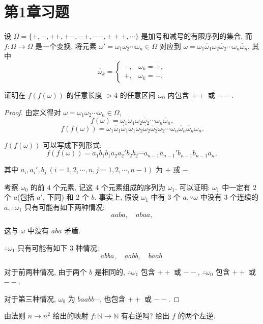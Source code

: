 \documentclass{ctexart}
\begin{document}
\section{第1章习题}
\setcounter{exsection}{5}
\begin{exercise}%
    设 $\Omega=\{+,-,++,+-,-+,--,+++,\cdots\}$ 是加号和减号的有限序列的集合, 而 $f:\Omega\to\Omega$ 是一个变换, 将元素 $\omega'=\omega_1\omega_2\cdots\omega_n\in\Omega$ 对应到 $\omega=\omega_1\dot{\omega_1}\omega_2\dot{\omega_2}\cdots\omega_n\dot{\omega_n}$, 其中
    \[\dot{\omega_k}=\begin{cases}
        -, & \omega_k=+, \\
        +, & \omega_k=-.
    \end{cases}\]
    
    证明在 $f(f(\omega))$ 的任意长度 $>4$ 的任意区间 $\omega_0$ 内包含 $++$ 或 $--$.    
\end{exercise}
\begin{proof}
    由定义得对 $\omega=\omega_1\omega_2\cdots\omega_n\in\Omega$,
    \[f(\omega)=\omega_1\dot{\omega_1}\omega_2\dot{\omega_2}\cdots\omega_n\dot{\omega_n},\]
    \[f(f(\omega))=\omega_1\dot{\omega_1}\dot{\omega_1}\omega_1\omega_2\dot{\omega_2}\dot{\omega_2}\omega_2\cdots\omega_n\dot{\omega_n}\dot{\omega_n}\omega_n.\]

    $f(f(\omega))$ 可以写成下列形式:
    \[f(f(\omega))=a_1b_1b_1a_2a_2'b_2b_2\cdots a_{n-1}a_{n-1}'b_{n-1}b_{n-1}a_n,\]

    其中 $a_i,a_i',b_j\ (i=1,2,\cdots,n,j=1,2,\cdots,n-1)$ 为 $+$ 或 $-$.

    考察 $\omega_0$ 的前 $4$ 个元素, 记这 $4$ 个元素组成的序列为 $\omega_1$. 可以证明: $\omega_1$ 中一定有 $2$ 个 $a$(包括 $a'$, 下同) 和 $2$ 个 $b$. 事实上, 假设 $\omega_1$ 中有 $3$ 个 $a,\because \omega$ 中没有 $3$ 个连续的 $a,\therefore \omega_1$ 只有可能有如下两种情况:
    \[aaba,\quad abaa,\]

    这与 $\omega$ 中没有 $aba$ 矛盾.

    $\therefore \omega_1$ 只有可能有如下 $3$ 种情况:
    \[abba,\quad aabb,\quad baab.\]

    对于前两种情况, 由于两个 $b$ 是相同的, $\therefore \omega_1$ 包含 $++$ 或 $--$, $\therefore \omega_0$ 包含 $++$ 或 $--$.

    对于第三种情况, $\omega_0$ 为 $baabb\cdots$, 也包含 $++$ 或 $--$.
\end{proof}
\begin{exercise}%
    由法则 $n\to n^2$ 给出的映射 $f:\mathbb{N}\to\mathbb{N}$ 有右逆吗? 给出 $f$ 的两个左逆.
\end{exercise}
\end{document}
